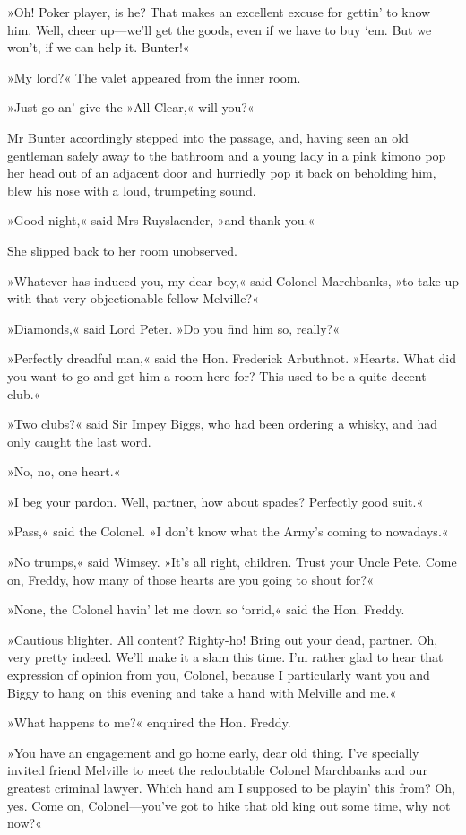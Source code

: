 »Oh! Poker player, is he? That makes an excellent excuse for gettin' to know him. Well, cheer up—we'll get the goods, even if we have to buy `em. But we won't, if we can help it. Bunter!«

»My lord?« The valet appeared from the inner room.

»Just go an' give the »All Clear,« will you?«

Mr Bunter accordingly stepped into the passage, and, having seen an old gentleman safely away to the bathroom and a young lady in a pink kimono pop her head out of an adjacent door and hurriedly pop it back on beholding him, blew his nose with a loud, trumpeting sound.

»Good night,« said Mrs Ruyslaender, »and thank you.«

She slipped back to her room unobserved.

»Whatever has induced you, my dear boy,« said Colonel Marchbanks, »to take up with that very objectionable fellow Melville?«

»Diamonds,« said Lord Peter. »Do you find him so, really?«

»Perfectly dreadful man,« said the Hon. Frederick Arbuthnot. »Hearts. What did you want to go and get him a room here for? This used to be a quite decent club.«

»Two clubs?« said Sir Impey Biggs, who had been ordering a whisky, and had only caught the last word.

»No, no, one heart.«

»I beg your pardon. Well, partner, how about spades? Perfectly good suit.«

»Pass,« said the Colonel. »I don't know what the Army's coming to nowadays.«

»No trumps,« said Wimsey. »It's all right, children. Trust your Uncle Pete. Come on, Freddy, how many of those hearts are you going to shout for?«

»None, the Colonel havin' let me down so `orrid,« said the Hon. Freddy.

»Cautious blighter. All content? Righty-ho! Bring out your dead, partner. Oh, very pretty indeed. We'll make it a slam this time. I'm rather glad to hear that expression of opinion from you, Colonel, because I particularly want you and Biggy to hang on this evening and take a hand with Melville and me.«

»What happens to me?« enquired the Hon. Freddy.

»You have an engagement and go home early, dear old thing. I've specially invited friend Melville to meet the redoubtable Colonel Marchbanks and our greatest criminal lawyer. Which hand am I supposed to be playin' this from? Oh, yes. Come on, Colonel—you've got to hike that old king out some time, why not now?«


